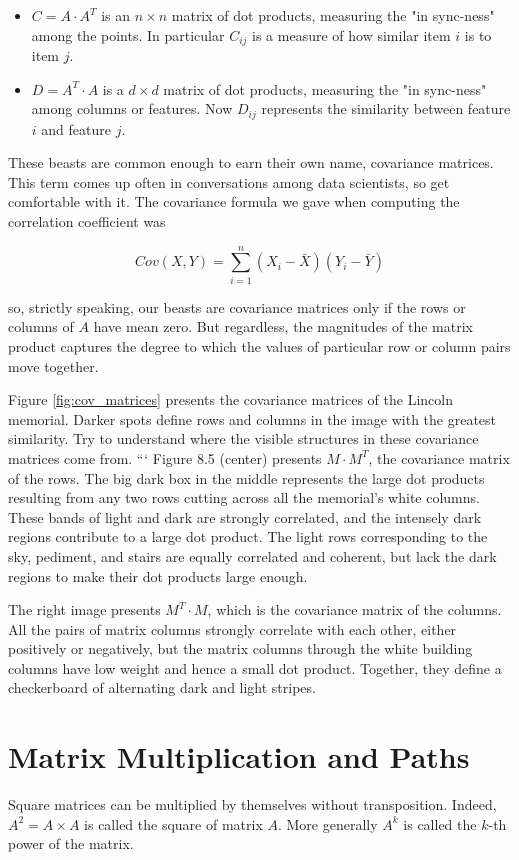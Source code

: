 \documentclass[10pt]{article}
\begin{document}
\begin{itemize}
  \item $C = A \cdot A^T$ is an $n \times n$ matrix of dot products, measuring the "in sync-ness" among the points. In particular $C_{ij}$ is a measure of how similar item $i$ is to item $j$.
  \item $D = A^T \cdot A$ is a $d \times d$ matrix of dot products, measuring the "in sync-ness" among columns or features. Now $D_{ij}$ represents the similarity between feature $i$ and feature $j$.
\end{itemize}

These beasts are common enough to earn their own name, covariance matrices. This term comes up often in conversations among data scientists, so get comfortable with it. The covariance formula we gave when computing the correlation coefficient was

\[ Cov(X, Y) = \sum_{i=1}^n(X_i - \bar{X})(Y_i - \bar{Y}) \]

so, strictly speaking, our beasts are covariance matrices only if the rows or columns of $A$ have mean zero. But regardless, the magnitudes of the matrix product captures the degree to which the values of particular row or column pairs move together.

Figure \ref{fig:cov_matrices} presents the covariance matrices of the Lincoln memorial. Darker spots define rows and columns in the image with the greatest similarity. Try to understand where the visible structures in these covariance matrices come from.
```
Figure 8.5 (center) presents \(M \cdot M^{T}\), the covariance matrix of the rows. The big dark box in the middle represents the large dot products resulting from any two rows cutting across all the memorial's white columns. These bands of light and dark are strongly correlated, and the intensely dark regions contribute to a large dot product. The light rows corresponding to the sky, pediment, and stairs are equally correlated and coherent, but lack the dark regions to make their dot products large enough.

The right image presents \(M^{T} \cdot M\), which is the covariance matrix of the columns. All the pairs of matrix columns strongly correlate with each other, either positively or negatively, but the matrix columns through the white building columns have low weight and hence a small dot product. Together, they define a checkerboard of alternating dark and light stripes.

\section*{Matrix Multiplication and Paths}
Square matrices can be multiplied by themselves without transposition. Indeed, \(A^{2} = A \times A\) is called the square of matrix \(A\). More generally \(A^{k}\) is called the \(k\)-th power of the matrix.
\end{document}
